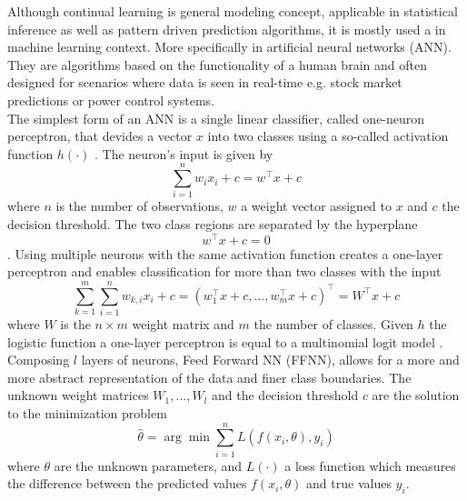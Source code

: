 Although continual learning is general modeling concept, applicable in statistical inference as well as pattern driven prediction algorithms, it is mostly used a in machine learning context. More specifically in artificial neural networks (ANN). They are algorithms based on the functionality of a human brain and often designed for scenarios where data is seen in real-time e.g. stock market predictions or power control systems.\\
The simplest form of an ANN is a single linear classifier, called one-neuron perceptron, that devides a vector $x$ into two classes using a so-called activation function $h(\cdot)$ \cite{Du_2019}. The neuron's input is given by
\begin{equation}
	\sum_{i = 1}^{n}{w_i x_i}+c = w^\top x+c
\end{equation}
where $n$ is the number of observations, $w$ a weight vector assigned to $x$ and $c$ the decision threshold. The two class regions are separated by the hyperplane \cite{Du_2019}
\begin{equation}
	w^\top x + c = 0
\end{equation}.
Using multiple neurons with the same activation function creates a one-layer perceptron and enables classification for more than two classes with the input
\begin{equation}
	\sum_{k = 1}^{m}\sum_{i=1}^{n}w_{k,i}x_i + c = (w_1^\top x + c, ..., w_m^\top x + c)^\top = W^\top x + c
\end{equation} 
where $W$ is the $n\times m$ weight matrix and $m$ the number of classes. Given $h$ the logistic function a one-layer perceptron is equal to a multinomial logit model \cite{Fahrmeir_2022}. Composing $l$ layers of neurons, Feed Forward NN (FFNN), allows for a more and more abstract representation of the data and finer class boundaries. The unknown weight matrices $W_1, ..., W_l$ and the decision threshold $c$ are the solution to the minimization problem
\begin{equation}
	\hat{\theta} = \arg\min{\sum_{i=1}^{n} L(f(x_i, \theta), y_i)}
\end{equation}
where $\theta$ are the unknown parameters, and $L(\cdot)$ a loss function which measures the difference between the predicted values $f(x_i, \theta)$ and true values $y_i$.\\
